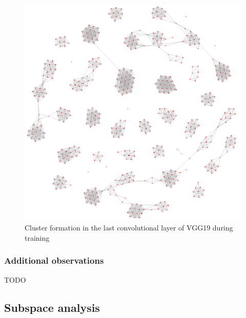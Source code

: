 \begin{figure}[H]
\centering
	\includegraphics[scale=0.3]{images/vgg-conv16-final.png}
\caption{Cluster formation in the last convolutional layer of VGG19 during training}
\label{fig:vgg-conv16-final} 
\end{figure}

\subsubsection*{Additional observations}
TODO

\subsection{Subspace analysis}

